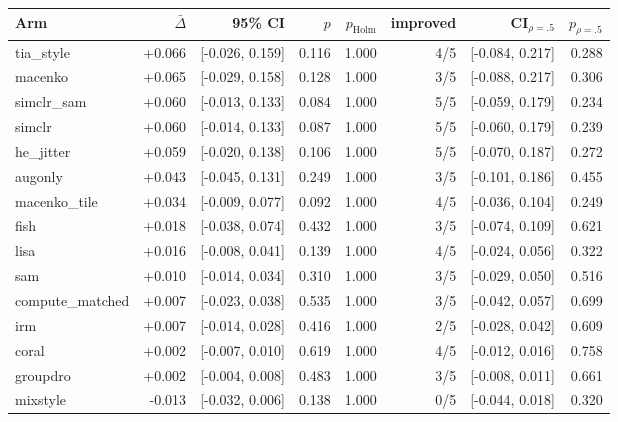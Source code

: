 \begin{tabular}{lrrrrrrr}
\toprule
Arm & $\bar\Delta$ & 95\% CI & $p$ & $p_\text{Holm}$ & improved & CI$_{\rho=.5}$ & $p_{\rho=.5}$ \\
\midrule
tia\_style & +0.066 & [-0.026, 0.159] & 0.116 & 1.000 & 4/5 & [-0.084, 0.217] & 0.288 \\
macenko & +0.065 & [-0.029, 0.158] & 0.128 & 1.000 & 3/5 & [-0.088, 0.217] & 0.306 \\
simclr\_sam & +0.060 & [-0.013, 0.133] & 0.084 & 1.000 & 5/5 & [-0.059, 0.179] & 0.234 \\
simclr & +0.060 & [-0.014, 0.133] & 0.087 & 1.000 & 5/5 & [-0.060, 0.179] & 0.239 \\
he\_jitter & +0.059 & [-0.020, 0.138] & 0.106 & 1.000 & 5/5 & [-0.070, 0.187] & 0.272 \\
augonly & +0.043 & [-0.045, 0.131] & 0.249 & 1.000 & 3/5 & [-0.101, 0.186] & 0.455 \\
macenko\_tile & +0.034 & [-0.009, 0.077] & 0.092 & 1.000 & 4/5 & [-0.036, 0.104] & 0.249 \\
fish & +0.018 & [-0.038, 0.074] & 0.432 & 1.000 & 3/5 & [-0.074, 0.109] & 0.621 \\
lisa & +0.016 & [-0.008, 0.041] & 0.139 & 1.000 & 4/5 & [-0.024, 0.056] & 0.322 \\
sam & +0.010 & [-0.014, 0.034] & 0.310 & 1.000 & 3/5 & [-0.029, 0.050] & 0.516 \\
compute\_matched & +0.007 & [-0.023, 0.038] & 0.535 & 1.000 & 3/5 & [-0.042, 0.057] & 0.699 \\
irm & +0.007 & [-0.014, 0.028] & 0.416 & 1.000 & 2/5 & [-0.028, 0.042] & 0.609 \\
coral & +0.002 & [-0.007, 0.010] & 0.619 & 1.000 & 4/5 & [-0.012, 0.016] & 0.758 \\
groupdro & +0.002 & [-0.004, 0.008] & 0.483 & 1.000 & 3/5 & [-0.008, 0.011] & 0.661 \\
mixstyle & -0.013 & [-0.032, 0.006] & 0.138 & 1.000 & 0/5 & [-0.044, 0.018] & 0.320 \\
\bottomrule
\end{tabular}
